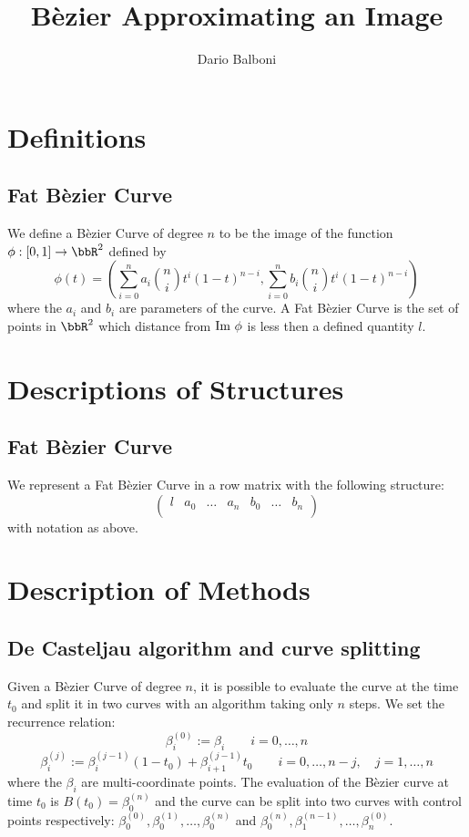 \documentclass[a4paper,NoNotes,GeneralMath]{stdmdoc}
\begin{document}
	\title{Bèzier Approximating an Image}
	\author{Dario Balboni}	
	\autodate

	\section*{Definitions}
	\subsection*{Fat Bèzier Curve}
	We define a Bèzier Curve of degree $n$ to be the image of the function $\phi: [0, 1] \rar \bbR^2$ defined by
	$$ \phi(t) = (\sum_{i=0}^n a_i \binom{n}{i} t^i (1-t)^{n-i},  \sum_{i=0}^n b_i \binom{n}{i} t^i (1-t)^{n-i}) $$
	where the $a_i$ and $b_i$ are parameters of the curve. A Fat Bèzier Curve is the set of points in $\bbR^2$ which
	distance from $\mbox{Im } \phi$ is less then a defined quantity $l$.

	\section*{Descriptions of Structures}
	\subsection*{Fat Bèzier Curve}
	We represent a Fat Bèzier Curve in a row matrix with the following structure:
	$$ \left( \begin{array}{ccccccc} l & a_0 & \ldots & a_n & b_0 & \ldots & b_n \\ \end{array} \right) $$
	with notation as above.

	\section*{Description of Methods}
	\subsection*{De Casteljau algorithm and curve splitting}
	Given a Bèzier Curve of degree $n$, it is possible to evaluate the curve at the time $t_0$ and split it in two
	curves with an algorithm taking only $n$ steps. We set the recurrence relation:
	$$ \beta_i^{(0)} := \beta_i \qquad i = 0, \ldots, n $$
	$$ \beta_i^{(j)} := \beta_i^{(j-1)} (1 - t_0) + \beta_{i+1}^{(j-1)} t_0 \qquad i = 0, \ldots, n-j, \quad j = 1 , \ldots, n $$
	where the $\beta_i$ are multi-coordinate points. The evaluation of the Bèzier curve at time $t_0$ is $B(t_0) = \beta_0^{(n)}$
	and the curve can be split into two curves with control points respectively: $\beta_0^{(0)}, \beta_0^{(1)}, \ldots, \beta_0^{(n)}$
	and $\beta_0^{(n)}, \beta_1^{(n-1)}, \ldots, \beta_n^{(0)}$. \\
\end{document}
